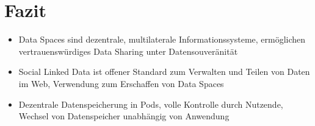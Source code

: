 
\section{Fazit}

\begin{itemize}

    \item Data Spaces sind dezentrale, multilaterale Informationssysteme, ermöglichen vertrauenswürdiges Data Sharing unter Datensouveränität

    \item Social Linked Data ist offener Standard zum Verwalten und Teilen von Daten im Web, Verwendung zum Erschaffen von Data Spaces
    
    \item Dezentrale Datenspeicherung in Pods, volle Kontrolle durch Nutzende, Wechsel von Datenspeicher unabhängig von Anwendung
    
    
    
\end{itemize}
